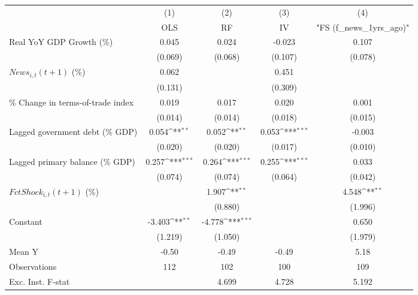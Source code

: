 {
\def\sym#1{\ifmmode^{#1}\else\(^{#1}\)\fi}
\begin{tabular}{l*{4}{c}}
\toprule
                    &\multicolumn{1}{c}{(1)}&\multicolumn{1}{c}{(2)}&\multicolumn{1}{c}{(3)}&\multicolumn{1}{c}{(4)}\\
                    &\multicolumn{1}{c}{OLS}&\multicolumn{1}{c}{RF}&\multicolumn{1}{c}{IV}&\multicolumn{1}{c}{ "FS (f_news_1yrs_ago)" }\\
\midrule
Real YoY GDP Growth (\%)&       0.045         &       0.024         &      -0.023         &       0.107         \\
                    &     (0.069)         &     (0.068)         &     (0.107)         &     (0.078)         \\
\addlinespace
$ News_{i,t}(t+1)$ (\%)&       0.062         &                     &       0.451         &                     \\
                    &     (0.131)         &                     &     (0.309)         &                     \\
\addlinespace
\% Change in terms-of-trade index&       0.019         &       0.017         &       0.020         &       0.001         \\
                    &     (0.014)         &     (0.014)         &     (0.018)         &     (0.015)         \\
\addlinespace
Lagged government debt (\% GDP)&       0.054\sym{**} &       0.052\sym{**} &       0.053\sym{***}&      -0.003         \\
                    &     (0.020)         &     (0.020)         &     (0.017)         &     (0.010)         \\
\addlinespace
Lagged primary balance (\% GDP)&       0.257\sym{***}&       0.264\sym{***}&       0.255\sym{***}&       0.033         \\
                    &     (0.074)         &     (0.074)         &     (0.064)         &     (0.042)         \\
\addlinespace
$ FctShock_{i,t}(t+1)$ (\%)&                     &       1.907\sym{**} &                     &       4.548\sym{**} \\
                    &                     &     (0.880)         &                     &     (1.996)         \\
\addlinespace
Constant            &      -3.403\sym{**} &      -4.778\sym{***}&                     &       0.650         \\
                    &     (1.219)         &     (1.050)         &                     &     (1.979)         \\
\midrule
Mean Y              &       -0.50         &       -0.49         &       -0.49         &        5.18         \\
Observations        &         112         &         102         &         100         &         109         \\
Exc. Inst. F-stat   &                     &       4.699         &       4.728         &       5.192         \\
\bottomrule
\end{tabular}
}
